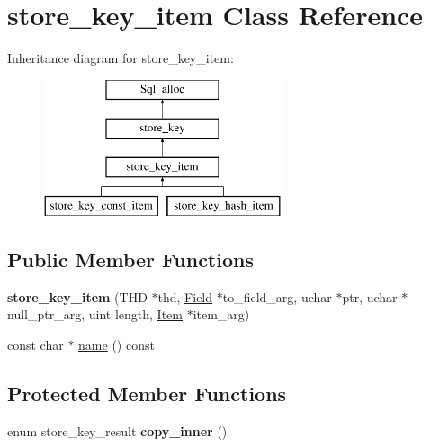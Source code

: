 \hypertarget{classstore__key__item}{}\section{store\+\_\+key\+\_\+item Class Reference}
\label{classstore__key__item}
Inheritance diagram for store\+\_\+key\+\_\+item\+:\begin{figure}[H]
\begin{center}
\leavevmode
\includegraphics[height=4.000000cm]{classstore__key__item}
\end{center}
\end{figure}
\subsection*{Public Member Functions}
\begin{DoxyCompactItemize}
\item 
\mbox{\label{classstore__key__item_aa0b52c45009d9df070623dac245d876d}} 
{\bfseries store\+\_\+key\+\_\+item} (T\+HD $\ast$thd, \mbox{\hyperlink{classField}{Field}} $\ast$to\+\_\+field\+\_\+arg, uchar $\ast$ptr, uchar $\ast$null\+\_\+ptr\+\_\+arg, uint length, \mbox{\hyperlink{classItem}{Item}} $\ast$item\+\_\+arg)
\item 
const char $\ast$ \mbox{\hyperlink{classstore__key__item_a88e2baa208896dcde9ba66e9715efc3c}{name}} () const
\end{DoxyCompactItemize}
\subsection*{Protected Member Functions}
\begin{DoxyCompactItemize}
\item 
\mbox{\label{classstore__key__item_a204bb6d75fbdcd93dd53d812922fed3f}} 
enum store\+\_\+key\+\_\+result {\bfseries copy\+\_\+inner} ()
\end{DoxyCompactItemize}
